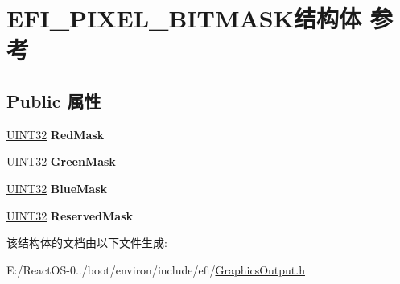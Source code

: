 \hypertarget{struct_e_f_i___p_i_x_e_l___b_i_t_m_a_s_k}{}\section{E\+F\+I\+\_\+\+P\+I\+X\+E\+L\+\_\+\+B\+I\+T\+M\+A\+S\+K结构体 参考}
\label{struct_e_f_i___p_i_x_e_l___b_i_t_m_a_s_k}
\subsection*{Public 属性}
\begin{DoxyCompactItemize}
\item 
\mbox{\label{struct_e_f_i___p_i_x_e_l___b_i_t_m_a_s_k_ab47af29667d90b66b8cc688c71972e13}} 
\hyperlink{_processor_bind_8h_ae1e6edbbc26d6fbc71a90190d0266018}{U\+I\+N\+T32} {\bfseries Red\+Mask}
\item 
\mbox{\label{struct_e_f_i___p_i_x_e_l___b_i_t_m_a_s_k_a2f6e9042c42a627fe6baf573201df73a}} 
\hyperlink{_processor_bind_8h_ae1e6edbbc26d6fbc71a90190d0266018}{U\+I\+N\+T32} {\bfseries Green\+Mask}
\item 
\mbox{\label{struct_e_f_i___p_i_x_e_l___b_i_t_m_a_s_k_a129a23be02f6c5b9b756724284d3e164}} 
\hyperlink{_processor_bind_8h_ae1e6edbbc26d6fbc71a90190d0266018}{U\+I\+N\+T32} {\bfseries Blue\+Mask}
\item 
\mbox{\label{struct_e_f_i___p_i_x_e_l___b_i_t_m_a_s_k_a5fbc3e74d6abf8b966b1228b6d3c8e61}} 
\hyperlink{_processor_bind_8h_ae1e6edbbc26d6fbc71a90190d0266018}{U\+I\+N\+T32} {\bfseries Reserved\+Mask}
\end{DoxyCompactItemize}


该结构体的文档由以下文件生成\+:\begin{DoxyCompactItemize}
\item 
E\+:/\+React\+O\+S-\/0../boot/environ/include/efi/\hyperlink{_graphics_output_8h}{Graphics\+Output.\+h}\end{DoxyCompactItemize}
